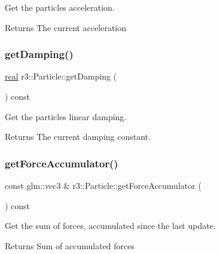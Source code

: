 Get the particle\textquotesingle{}s acceleration. 

\begin{DoxyReturn}{Returns}
The current acceleration 
\end{DoxyReturn}
\mbox{\label{classr3_1_1_particle_a5e8544a8ac8e4765a9021f9112209eba}} 
\subsubsection{\texorpdfstring{get\+Damping()}{getDamping()}}
{\footnotesize\ttfamily \mbox{\hyperlink{namespacer3_ab2016b3e3f743fb735afce242f0dc1eb}{real}} r3\+::\+Particle\+::get\+Damping (\begin{DoxyParamCaption}{ }\end{DoxyParamCaption}) const}



Get the particle\textquotesingle{}s linear damping. 

\begin{DoxyReturn}{Returns}
The current damping constant. 
\end{DoxyReturn}
\mbox{\label{classr3_1_1_particle_a81fe0cfac976df7da6337dabc8f73313}} 
\subsubsection{\texorpdfstring{get\+Force\+Accumulator()}{getForceAccumulator()}}
{\footnotesize\ttfamily const glm\+::vec3 \& r3\+::\+Particle\+::get\+Force\+Accumulator (\begin{DoxyParamCaption}{ }\end{DoxyParamCaption}) const}



Get the sum of forces, accumulated since the last update. 

\begin{DoxyReturn}{Returns}
Sum of accumulated forces 
\end{DoxyReturn}
\mbox{\label{classr3_1_1_particle_a6924e65c0aacb7e50057e43be134156b}} 
